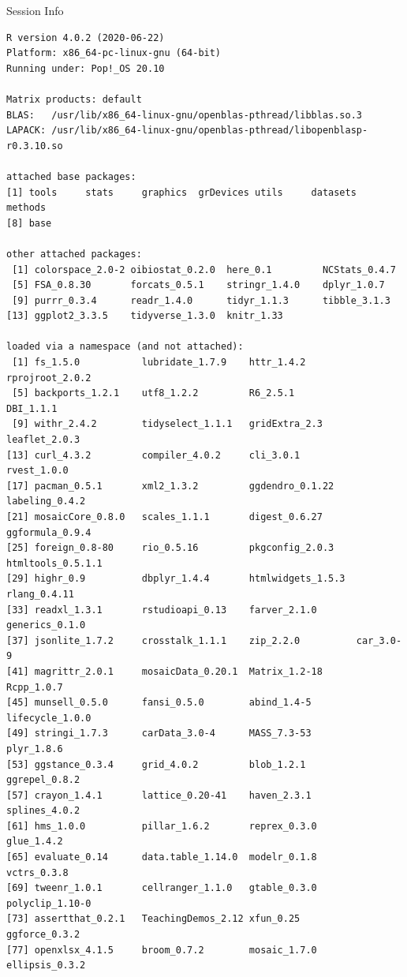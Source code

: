 \documentclass[10pt,handout]{beamer}\usepackage[]{graphicx}\usepackage[]{color}
\makeatletter
\newenvironment{kframe}{%
 \def\at@end@of@kframe{}%
 \ifinner\ifhmode%
  \def\at@end@of@kframe{\end{minipage}}%
  \begin{minipage}{\columnwidth}%
 \fi\fi%
 \def\FrameCommand##1{\hskip\@totalleftmargin \hskip-\fboxsep
 \colorbox{shadecolor}{##1}\hskip-\fboxsep
     \hskip-\linewidth \hskip-\@totalleftmargin \hskip\columnwidth}%
 \MakeFramed {\advance\hsize-\width
   \@totalleftmargin\z@ \linewidth\hsize
   \@setminipage}}%
 {\par\unskip\endMakeFramed%
 \at@end@of@kframe}
\newenvironment{knitrout}{}{} %
\makeatother
\begin{document}
	
	\begin{frame}[fragile]{Session Info}
		\tiny
		
\begin{knitrout}\tiny
{}\color{fgcolor}\begin{kframe}
\begin{verbatim}
R version 4.0.2 (2020-06-22)
Platform: x86_64-pc-linux-gnu (64-bit)
Running under: Pop!_OS 20.10

Matrix products: default
BLAS:   /usr/lib/x86_64-linux-gnu/openblas-pthread/libblas.so.3
LAPACK: /usr/lib/x86_64-linux-gnu/openblas-pthread/libopenblasp-r0.3.10.so

attached base packages:
[1] tools     stats     graphics  grDevices utils     datasets  methods  
[8] base     

other attached packages:
 [1] colorspace_2.0-2 oibiostat_0.2.0  here_0.1         NCStats_0.4.7   
 [5] FSA_0.8.30       forcats_0.5.1    stringr_1.4.0    dplyr_1.0.7     
 [9] purrr_0.3.4      readr_1.4.0      tidyr_1.1.3      tibble_3.1.3    
[13] ggplot2_3.3.5    tidyverse_1.3.0  knitr_1.33      

loaded via a namespace (and not attached):
 [1] fs_1.5.0           lubridate_1.7.9    httr_1.4.2         rprojroot_2.0.2   
 [5] backports_1.2.1    utf8_1.2.2         R6_2.5.1           DBI_1.1.1         
 [9] withr_2.4.2        tidyselect_1.1.1   gridExtra_2.3      leaflet_2.0.3     
[13] curl_4.3.2         compiler_4.0.2     cli_3.0.1          rvest_1.0.0       
[17] pacman_0.5.1       xml2_1.3.2         ggdendro_0.1.22    labeling_0.4.2    
[21] mosaicCore_0.8.0   scales_1.1.1       digest_0.6.27      ggformula_0.9.4   
[25] foreign_0.8-80     rio_0.5.16         pkgconfig_2.0.3    htmltools_0.5.1.1 
[29] highr_0.9          dbplyr_1.4.4       htmlwidgets_1.5.3  rlang_0.4.11      
[33] readxl_1.3.1       rstudioapi_0.13    farver_2.1.0       generics_0.1.0    
[37] jsonlite_1.7.2     crosstalk_1.1.1    zip_2.2.0          car_3.0-9         
[41] magrittr_2.0.1     mosaicData_0.20.1  Matrix_1.2-18      Rcpp_1.0.7        
[45] munsell_0.5.0      fansi_0.5.0        abind_1.4-5        lifecycle_1.0.0   
[49] stringi_1.7.3      carData_3.0-4      MASS_7.3-53        plyr_1.8.6        
[53] ggstance_0.3.4     grid_4.0.2         blob_1.2.1         ggrepel_0.8.2     
[57] crayon_1.4.1       lattice_0.20-41    haven_2.3.1        splines_4.0.2     
[61] hms_1.0.0          pillar_1.6.2       reprex_0.3.0       glue_1.4.2        
[65] evaluate_0.14      data.table_1.14.0  modelr_0.1.8       vctrs_0.3.8       
[69] tweenr_1.0.1       cellranger_1.1.0   gtable_0.3.0       polyclip_1.10-0   
[73] assertthat_0.2.1   TeachingDemos_2.12 xfun_0.25          ggforce_0.3.2     
[77] openxlsx_4.1.5     broom_0.7.2        mosaic_1.7.0       ellipsis_0.3.2    
\end{verbatim}
\end{kframe}
\end{knitrout}
		
	\end{frame}
	
\end{document}
